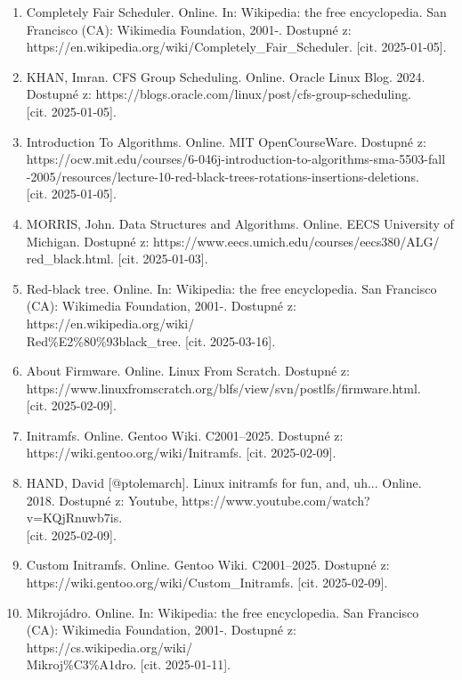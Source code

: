 \documentclass[12pt,a4paper,twoside,]{article}
\begin{document}
{{{{{{\begin{enumerate}
	\item Completely Fair Scheduler. Online. In: Wikipedia: the free encyclopedia. San Francisco (CA): Wikimedia Foundation, 2001-. Dostupné z:\\ https://en.wikipedia.org/wiki/Completely\_Fair\_Scheduler. [cit. 2025-01-05].
	\item KHAN, Imran. CFS Group Scheduling. Online. Oracle Linux Blog. 2024. Dostupné z: https://blogs.oracle.com/linux/post/cfs-group-scheduling. \\{[cit. 2025-01-05]}.
	\item Introduction To Algorithms. Online. MIT OpenCourseWare. Dostupné z:\\ https://ocw.mit.edu/courses/6-046j-introduction-to-algorithms-sma-5503-fall\\-2005/resources/lecture-10-red-black-trees-rotations-insertions-deletions.\\ {[cit. 2025-01-05]}.
	\item MORRIS, John. Data Structures and Algorithms. Online. EECS University of Michigan. Dostupné z: https://www.eecs.umich.edu/courses/eecs380/ALG/\\red\_black.html. [cit. 2025-01-03].
	\item Red-black tree. Online. In: Wikipedia: the free encyclopedia. San Francisco (CA): Wikimedia Foundation, 2001-. Dostupné z: https://en.wikipedia.org/wiki/\\Red\%E2\%80\%93black\_tree. [cit. 2025-03-16].
	\item About Firmware. Online. Linux From Scratch. Dostupné z: \\https://www.linuxfromscratch.org/blfs/view/svn/postlfs/firmware.html.\\ {[cit. 2025-02-09]}.
	\item Initramfs. Online. Gentoo Wiki. C2001–2025. Dostupné z:\\ https://wiki.gentoo.org/wiki/Initramfs. [cit. 2025-02-09].
	\item HAND, David [@ptolemarch]. Linux initramfs for fun, and, uh... Online. 2018. Dostupné z: Youtube, https://www.youtube.com/watch?v=KQjRnuwb7is.\\ {[cit. 2025-02-09]}.
	\item Custom Initramfs. Online. Gentoo Wiki. C2001–2025. Dostupné z: \\https://wiki.gentoo.org/wiki/Custom\_Initramfs. [cit. 2025-02-09].
	\item Mikrojádro. Online. In: Wikipedia: the free encyclopedia. San Francisco (CA): Wikimedia Foundation, 2001-. Dostupné z: https://cs.wikipedia.org/wiki/\\Mikroj\%C3\%A1dro. [cit. 2025-01-11].

\end{enumerate}}}}}}}
\end{document}
